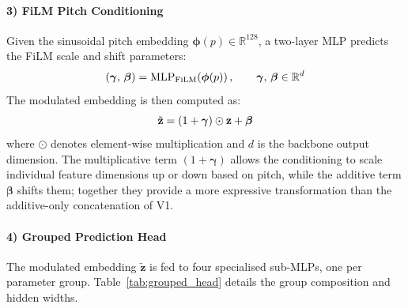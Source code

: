 \paragraph{3) FiLM Pitch Conditioning}
Given the sinusoidal pitch embedding $\boldsymbol{\phi}(p) \in \mathbb{R}^{128}$, a two-layer MLP predicts the FiLM scale and shift parameters:
\begin{equation}
    (\boldsymbol{\gamma},\, \boldsymbol{\beta}) = \text{MLP}_{\text{FiLM}}\!\left(\boldsymbol{\phi}(p)\right), \qquad \boldsymbol{\gamma},\, \boldsymbol{\beta} \in \mathbb{R}^{d}
    \label{eq:film_pred}\eqname{FiLM scale and shift prediction}
\end{equation}
The modulated embedding is then computed as:
\begin{equation}
    \tilde{\mathbf{z}} = (1 + \boldsymbol{\gamma}) \odot \mathbf{z} + \boldsymbol{\beta}
    \label{eq:film_apply}\eqname{FiLM modulation of the embedding}
\end{equation}
where $\odot$ denotes element-wise multiplication and $d$ is the backbone output dimension. The multiplicative term $(1 + \boldsymbol{\gamma})$ allows the conditioning to scale individual feature dimensions up or down based on pitch, while the additive term $\boldsymbol{\beta}$ shifts them; together they provide a more expressive transformation than the additive-only concatenation of V1.

\paragraph{4) Grouped Prediction Head}
The modulated embedding $\tilde{\mathbf{z}}$ is fed to four specialised sub-MLPs, one per parameter group. Table~\ref{tab:grouped_head} details the group composition and hidden widths.


